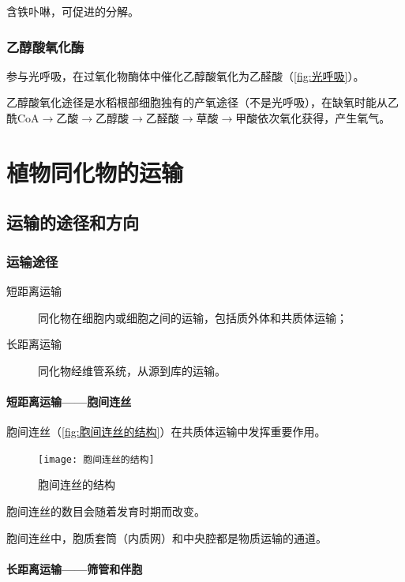 含铁卟啉，可促进的分解。

\subsubsection{乙醇酸氧化酶}

参与光呼吸，在过氧化物酶体中催化乙醇酸氧化为乙醛酸（\autoref{fig:光呼吸}）。

乙醇酸氧化途径是水稻根部细胞独有的产氧途径（不是光呼吸），在缺氧时能从乙酰CoA$\longrightarrow$乙酸$\longrightarrow$乙醇酸$\longrightarrow$乙醛酸$\longrightarrow$草酸$\longrightarrow$甲酸依次氧化获得，产生氧气。

\section{植物同化物的运输}

\subsection{运输的途径和方向}

\subsubsection{运输途径}

\begin{description}
	\item[短距离运输] 同化物在细胞内或细胞之间的运输，包括质外体和共质体运输；
	\item[长距离运输] 同化物经维管系统，从源到库的运输。
\end{description}

\paragraph{短距离运输——胞间连丝}

胞间连丝（\autoref{fig:胞间连丝的结构}）在共质体运输中发挥重要作用。

\begin{figure}[htbp]
	\centering
	\texttt{[image: 胞间连丝的结构]}
	\caption{胞间连丝的结构}
	\label{fig:胞间连丝的结构}
\end{figure}

胞间连丝的数目会随着发育时期而改变。

胞间连丝中，胞质套筒（内质网）和中央腔都是物质运输的通道。

\paragraph{长距离运输——筛管和伴胞}


